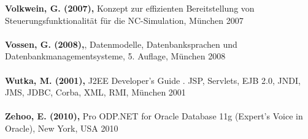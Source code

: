 \textbf{Volkwein, G. (2007),} Konzept zur effizienten Bereitstellung von Steuerungsfunktionalität für die NC-Simulation, München 2007\\\\
\textbf{Vossen, G. (2008),}, Datenmodelle, Datenbanksprachen und Datenbankmanagementsysteme, 5. Auflage, München 2008\\\\
\textbf{Wutka, M. (2001),} J2EE Developer's Guide . JSP, Servlets, EJB 2.0, JNDI, JMS, JDBC, Corba, XML, RMI, München 2001\\\\
\textbf{Zehoo, E. (2010),} Pro ODP.NET for Oracle Database 11g (Expert's Voice in Oracle), New York, USA 2010\\\\



